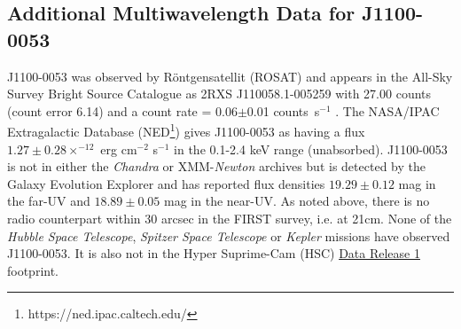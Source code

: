 \documentclass[a4paper,fleqn,usenatbib]{mnras}
\begin{document}
\subsection{Additional Multiwavelength Data for J1100-0053}
J1100-0053 was observed by R\"{o}ntgensatellit (ROSAT) and appears in
the All-Sky Survey Bright Source Catalogue \citep[RASS-BSC;
][]{Appenzeller1998, Voges1999} as 2RXS J110058.1-005259 with 27.00
counts (count error 6.14) and a count rate = 0.06$\pm$0.01
counts~s$^{-1}$ \citep{Boller2016}. The NASA/IPAC Extragalactic
Database (NED\footnote{https://ned.ipac.caltech.edu/}) gives
J1100-0053 as having a flux $1.27\pm0.28 \times^{-12}$ erg cm$^{-2}$
s$^{-1}$ in the 0.1-2.4 keV range (unabsorbed). J1100-0053 is not in
either the {\it Chandra} or XMM-{\it Newton} archives but is detected
by the Galaxy Evolution Explorer \citep[GALEX; ][]{Martin2005,
Morrissey2007} and has reported flux densities $19.29\pm0.12$ mag in
the far-UV and $18.89\pm0.05$ mag in the near-UV. As noted above,
there is no radio counterpart within 30 arcsec in the FIRST survey,
i.e. at 21cm. None of the {\it Hubble Space Telescope}, {\it Spitzer
Space Telescope} or {\it Kepler} missions have observed J1100-0053.
It is also not in the Hyper Suprime-Cam (HSC)
\href{https://hsc-release.mtk.nao.ac.jp/doc/}{Data Release 1}
\citep{Aihara2017} footprint.
\end{document}
